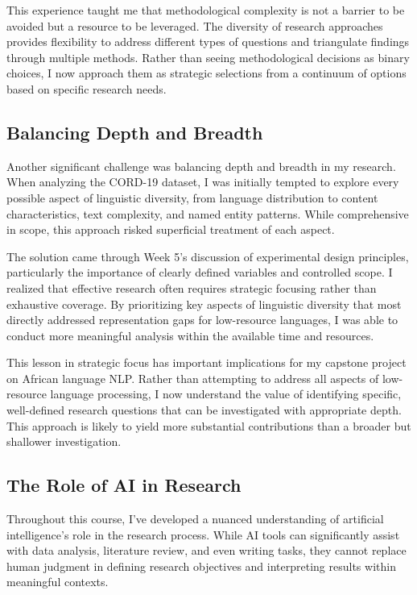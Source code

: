 \documentclass[
]{article}
\begin{document}
This experience taught me that methodological complexity is not a
barrier to be avoided but a resource to be leveraged. The diversity of
research approaches provides flexibility to address different types of
questions and triangulate findings through multiple methods. Rather than
seeing methodological decisions as binary choices, I now approach them
as strategic selections from a continuum of options based on specific
research needs.

\subsection{Balancing Depth and
Breadth}\label{balancing-depth-and-breadth}

Another significant challenge was balancing depth and breadth in my
research. When analyzing the CORD-19 dataset, I was initially tempted to
explore every possible aspect of linguistic diversity, from language
distribution to content characteristics, text complexity, and named
entity patterns. While comprehensive in scope, this approach risked
superficial treatment of each aspect.

The solution came through Week 5's discussion of experimental design
principles, particularly the importance of clearly defined variables and
controlled scope. I realized that effective research often requires
strategic focusing rather than exhaustive coverage. By prioritizing key
aspects of linguistic diversity that most directly addressed
representation gaps for low-resource languages, I was able to conduct
more meaningful analysis within the available time and resources.

This lesson in strategic focus has important implications for my
capstone project on African language NLP. Rather than attempting to
address all aspects of low-resource language processing, I now
understand the value of identifying specific, well-defined research
questions that can be investigated with appropriate depth. This approach
is likely to yield more substantial contributions than a broader but
shallower investigation.

\subsection{The Role of AI in
Research}\label{the-role-of-ai-in-research}

Throughout this course, I've developed a nuanced understanding of
artificial intelligence's role in the research process. While AI tools
can significantly assist with data analysis, literature review, and even
writing tasks, they cannot replace human judgment in defining research
objectives and interpreting results within meaningful contexts.
\end{document}
